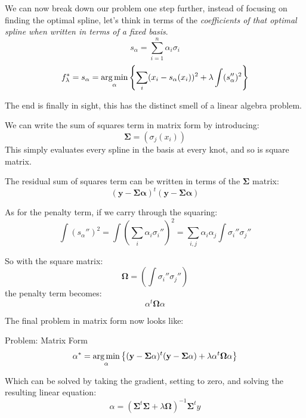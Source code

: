 \begin{frame}
  We can now break down our problem one step further, instead of focusing on finding the optimal spline, let's think in terms of the \textit{coefficients of that optimal spline when written in terms of a fixed basis}.
    $$ s_{\alpha} = \sum_{i=1}^{n} \alpha_i \sigma_i $$
    $$ f_{\lambda}^* = s_{\alpha} = \operatorname*{arg\,min}_{\alpha} \left\{ \sum_i (x_i - s_{\alpha}(x_i))^2 + \lambda \int (s_{\alpha}'')^2 \right\} $$
\end{frame}
%
%
\begin{frame}
  The end is finally in sight, this has the distinct smell of a linear algebra problem. 
\end{frame}
%
%
\begin{frame}
  We can write the sum of squares term in matrix form by introducing:
  $$ \mathbf{\Sigma} = \left( \sigma_j (x_i) \right) $$
  This simply evaluates every spline in the basis at every knot, and so is square matrix.
\end{frame}
%
%
\begin{frame}
  The residual sum of squares term can be written in terms of the $\mathbf{\Sigma}$ matrix:
  $$ (\mathbf{y} - \mathbf{\Sigma} \mathbf{\alpha})^{t}(\mathbf{y} - \mathbf{\Sigma} \mathbf{\alpha})$$
\end{frame}
%
%
\begin{frame}
  As for the penalty term, if we carry through the squaring:
  $$ \int (s_{\alpha}'')^2 = \int \left( \sum_i \alpha_i \sigma_i'' \right)^2 = \sum_{i,j} \alpha_i \alpha_j \int \sigma_i'' \sigma_j'' $$
\end{frame}
%
%
\begin{frame}
  So with the square matrix:
  $$ \mathbf{\Omega} = \left( \int \sigma_i'' \sigma_j'' \right) $$
  the penalty term becomes:
  $$ \alpha^t \mathbf{\Omega} \alpha $$
\end{frame}
%
%
\begin{frame}
  The final problem in matrix form now looks like:
  \begin{block}{Problem: Matrix Form}
    $$\alpha^* = \operatorname*{arg\,min}_{\alpha} \left\{ (\mathbf{y} - \mathbf{\Sigma} \mathbf{\alpha})^{t}(\mathbf{y} - \mathbf{\Sigma} \mathbf{\alpha}) + \lambda \alpha^t \mathbf{\Omega} \alpha \right\} $$ 
  \end{block}
  Which can be solved by taking the gradient, setting to zero, and solving the resulting linear equation:
  $$ \alpha = ( \mathbf{\Sigma}^t \mathbf{\Sigma} + \lambda \mathbf{\Omega} )^{-1} \mathbf{\Sigma}^t y $$
\end{frame}
